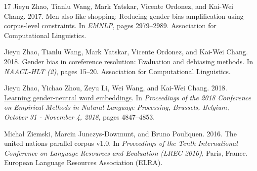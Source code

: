 \documentclass[11pt,a4paper]{article}
\begin{document}
\begin{thebibliography}{17}
Jieyu Zhao, Tianlu Wang, Mark Yatskar, Vicente Ordonez, and Kai{-}Wei Chang.
  2017.
\newblock Men also like shopping: Reducing gender bias amplification using
  corpus-level constraints.
\newblock In \emph{{EMNLP}}, pages 2979--2989. Association for Computational
  Linguistics.

Jieyu Zhao, Tianlu Wang, Mark Yatskar, Vicente Ordonez, and Kai{-}Wei Chang.
  2018{}.
\newblock Gender bias in coreference resolution: Evaluation and debiasing
  methods.
\newblock In \emph{{NAACL-HLT} {(2)}}, pages 15--20. Association for
  Computational Linguistics.

Jieyu Zhao, Yichao Zhou, Zeyu Li, Wei Wang, and Kai{-}Wei Chang.
  2018{}.
\newblock \href {https://aclanthology.info/papers/D18-1521/d18-1521} {Learning
  gender-neutral word embeddings}.
\newblock In \emph{Proceedings of the 2018 Conference on Empirical Methods in
  Natural Language Processing, Brussels, Belgium, October 31 - November 4,
  2018}, pages 4847--4853.

Michał Ziemski, Marcin Junczys-Dowmunt, and Bruno Pouliquen. 2016.
\newblock The united nations parallel corpus v1.0.
\newblock In \emph{Proceedings of the Tenth International Conference on
  Language Resources and Evaluation (LREC 2016)}, Paris, France. European
  Language Resources Association (ELRA).

\end{thebibliography}





 
\end{document}
